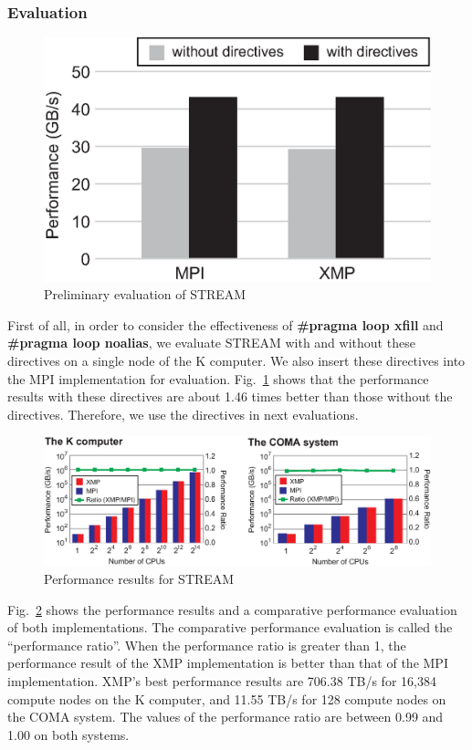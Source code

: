 \documentclass[graybox]{svmult}
\begin{document}
\subsubsection{Evaluation}
\begin{figure}[h]
\sidecaption
\includegraphics[scale=0.5,clip]{img/result-stream-pre.eps}
\caption{Preliminary evaluation of STREAM\cite{hpca}}\label{fig:result-stream-pre}
\end{figure}

First of all,
in order to consider the effectiveness of {\bf \#pragma loop xfill} and {\bf \#pragma loop noalias},
we evaluate STREAM with and without these directives on a single node of the K computer.
We also insert these directives into the MPI implementation for evaluation.
Fig.~\ref{fig:result-stream-pre} shows that the performance results with these directives are about 1.46 times better than those without the directives.
Therefore, we use the directives in next evaluations.

\begin{figure}[h]
\sidecaption
\includegraphics[scale=0.4,clip]{img/result-stream.eps}
\caption{Performance results for STREAM\cite{hpca}}\label{fig:result-stream}
\end{figure}

Fig.~\ref{fig:result-stream} shows the performance results and a comparative performance evaluation of both implementations.
The comparative performance evaluation is called the ``performance ratio''.
When the performance ratio is greater than 1,
the performance result of the XMP implementation is better than that of the MPI implementation.
XMP's best performance results are 706.38 TB/s for 16,384 compute nodes on the K computer,
and 11.55 TB/s for 128 compute nodes on the COMA system.
The values of the performance ratio are between 0.99 and 1.00 on both systems.
\end{document}
